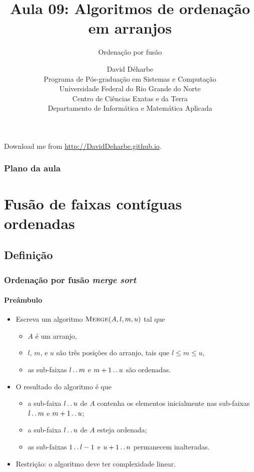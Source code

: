 \documentclass{beamer}
\title{Aula 09: Algoritmos de ordenação em arranjos}
\subtitle{Ordenação por fusão}
\author{David Déharbe \\
  Programa de Pós-graduação em Sistemas e Computação \\
  Universidade Federal do Rio Grande do Norte \\
  Centro de Ciências Exatas e da Terra \\
  Departamento de Informática e Matemática Aplicada}
\date{}
\begin{document}
\begin{frame}
  \titlepage
  Download me from \url{http://DavidDeharbe.github.io}.
\end{frame}

\begin{frame}
  \frametitle{Plano da aula}
  \tableofcontents
\end{frame}

\section{Fusão de faixas contíguas ordenadas}

\subsection{Definição}

\begin{frame}

  \frametitle{Ordenação por fusão \textit{merge sort}}
  \framesubtitle{Preâmbulo}

\begin{itemize}

\item Escreva um algoritmo $\textnormal{\scshape Merge}(A, l, m, u)$ tal que
\begin{itemize}
\item $A$ é um arranjo,
\item $l$, $m$, e $u$ são três posições do arranjo, tais que $l \le m \le u$,
\item as sub-faixas $l \mathinner{\ldotp\ldotp} m$ e $m+1 \mathinner{\ldotp\ldotp} u$ são ordenadas.
\end{itemize}
\item O resultado do algoritmo é que 
\begin{itemize}
\item a sub-faixa $l \mathinner{\ldotp\ldotp} u$ de $A$ contenha os elementos inicialmente 
  nas sub-faixas $l \mathinner{\ldotp\ldotp} m$ e $m+1 \mathinner{\ldotp\ldotp} u$;
\item a sub-faixa $l \mathinner{\ldotp\ldotp} u$ de $A$ esteja ordenada;
\item as sub-faixas $1 \mathinner{\ldotp\ldotp} l-1$ e $u+1 \mathinner{\ldotp\ldotp} n$ permanecem inalteradas.
\end{itemize}
\item Restrição: o algoritmo deve ter complexidade linear.

\end{itemize}

\end{frame}
\end{document}

